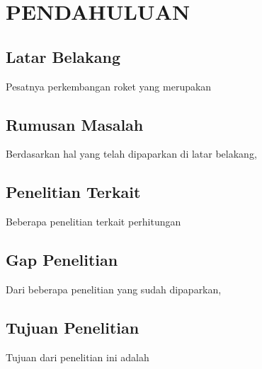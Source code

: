 \section{PENDAHULUAN}

\subsection{Latar Belakang}

Pesatnya perkembangan roket yang merupakan \lipsum[1]

\lipsum[2]

\lipsum[3][1-10]

\subsection{Rumusan Masalah}

Berdasarkan hal yang telah dipaparkan di latar belakang, \lipsum[4]

\subsection{Penelitian Terkait}

Beberapa penelitian terkait perhitungan \lipsum[5]

\subsection{Gap Penelitian}

Dari beberapa penelitian yang sudah dipaparkan, \lipsum[6]

\subsection{Tujuan Penelitian}

Tujuan dari penelitian ini adalah \lipsum[7]